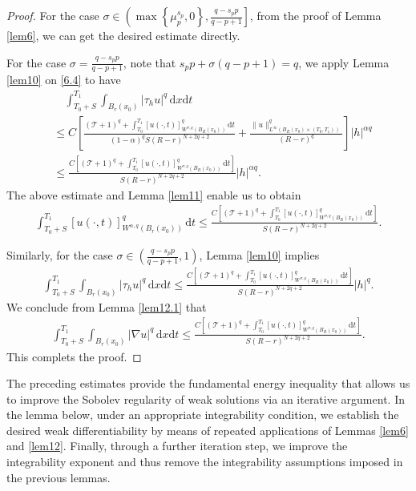 \documentclass[reqno,10pt]{amsart}
\numberwithin{equation}{section}
\begin{document}
\begin{proof}
	For the case $\sigma\in \left(\max\left\lbrace\mu^{s_p}_p, 0\right\rbrace, \frac{q-s_pp}{q-p+1}\right]$, from the proof of Lemma \ref{lem6}, we can get the desired estimate directly.
	
	For the case $\sigma=\frac{q-s_pp}{q-p+1}$, note that $s_pp+\sigma(q-p+1)=q$, we apply Lemma \ref{lem10} on \eqref{6.4} to have
	\begin{align*}
		&\quad\int_{T_0+S}^{T_1}\int_{B_r(x_0)}|\tau_hu|^q\,\mathrm{d}x\mathrm{d}t\\
		&\le C\left[\frac{\left( \mathcal{T}+1\right)^q+\int_{T_0}^{T_1}[u(\cdot,t)]^q_{W^{\sigma,q}\left(B_R(x_0)\right)}\,\mathrm{d}t}{(1-\alpha)^qS(R-r)^{N+2q+2}}+\frac{\|u\|^q_{L^\infty\left(B_R(x_0)\times(T_0,T_1)\right) }}{(R-r)^{q}}\right]|h|^{\alpha q}\\
		&\le\frac{C\left[\left( \mathcal{T}+1\right)^q+\int_{T_0}^{T_1}[u(\cdot,t)]^q_{W^{\sigma,q}\left(B_R(x_0)\right)}\,\mathrm{d}t\right]}{S(R-r)^{N+2q+2}}|h|^{\alpha q}.
	\end{align*}
	The above estimate and Lemma \ref{lem11} enable us to obtain
	\begin{align*}
		\int_{T_0+S}^{T_1}[u(\cdot,t)]^q_{W^{\alpha,q}(B_r(x_0))}\,\mathrm{d}t\le \frac{C\left[\left( \mathcal{T}+1\right)^q+\int_{T_0}^{T_1}[u(\cdot,t)]^q_{W^{\sigma,q}\left(B_R(x_0)\right)}\,\mathrm{d}t\right]}{S(R-r)^{N+2q+2}}.
	\end{align*} 
	
	Similarly, for the case $\sigma\in \left(\frac{q-s_pp}{q-p+1},1\right)$, Lemma \ref{lem10} implies
	\begin{align*}
		\int_{T_0+S}^{T_1}\int_{B_r(x_0)}|\tau_hu|^q\,\mathrm{d}x\mathrm{d}t\le \frac{C\left[\left( \mathcal{T}+1\right)^q+\int_{T_0}^{T_1}[u(\cdot,t)]^q_{W^{\sigma,q}\left(B_R(x_0)\right)}\,\mathrm{d}t\right]}{S(R-r)^{N+2q+2}}|h|^{q}.
	\end{align*}
	We conclude from Lemma \ref{lem12.1} that
	\begin{align*}
		\int_{T_0+S}^{T_1}\int_{B_r(x_0)}|\nabla u|^q\,\mathrm{d}x\mathrm{d}t\le \frac{C\left[\left( \mathcal{T}+1\right)^q+\int_{T_0}^{T_1}[u(\cdot,t)]^q_{W^{\sigma,q}\left(B_R(x_0)\right)}\,\mathrm{d}t\right]}{S(R-r)^{N+2q+2}}.
	\end{align*}
This complets the proof.
\end{proof}

The preceding estimates provide the fundamental energy inequality that allows us to improve the Sobolev regularity of weak solutions via an iterative argument. In the lemma below, under an appropriate integrability condition, we establish the desired weak differentiability by means of repeated applications of Lemmas \ref{lem6} and \ref{lem12}. Finally, through a further iteration step, we improve the integrability exponent and thus remove the integrability assumptions imposed in the previous lemmas.
\end{document}
